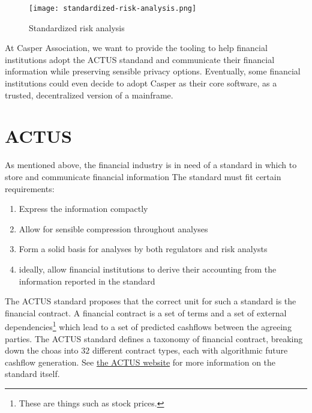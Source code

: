 \documentclass[12pt]{article}
\begin{document}
\begin{figure}
  \centering
  \texttt{[image: standardized-risk-analysis.png]}
  \caption{Standardized risk analysis}
  \label{fig:standard-risk-analysis}
\end{figure}


At Casper Association, we want to provide the tooling to help financial
institutions adopt the ACTUS standand and communicate their financial
information while preserving sensible privacy options. Eventually, some
financial institutions could even decide to adopt Casper as their core software,
as a trusted, decentralized version of a mainframe.

\section{ACTUS} \label{actus}

As mentioned above, the financial industry is in need of a standard in which to
store and communicate financial information The standard must fit certain requirements:
\begin{enumerate}
  \item Express the information compactly
  \item Allow for sensible compression throughout analyses
  \item Form a solid basis for analyses by both regulators and risk analysts
  \item ideally, allow financial institutions to derive their accounting from
    the information reported in the standard
\end{enumerate}

The ACTUS standard proposes that the correct unit for such a standard is the
financial contract.
A financial contract is a set of terms and a set of external
dependencies\footnote{
  These are things such as stock prices.
} which lead to a set of predicted cashflows between the agreeing parties. The
ACTUS standard defines a taxonomy of financial contract, breaking down the choas
into $32$ different contract types, each with algorithmic future cashflow
generation. See \href{https://www.actusfrf.org/}{the ACTUS website} for more
information on the standard itself.
\end{document}
